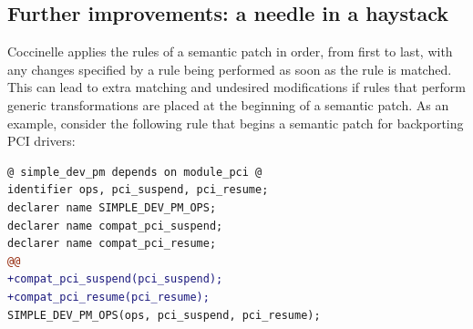 



\subsection{Further improvements: a needle in a haystack}

Coccinelle applies the rules of a semantic patch in order, from first to
last, with any changes specified by a rule being performed as soon as
the rule is matched.  This can lead to extra matching and undesired
modifications if rules that perform generic transformations are placed at
the beginning of a semantic patch.  As an example, consider the following
rule that begins a semantic patch for backporting PCI drivers:

\begin{lstlisting}[language=diff]
@ simple_dev_pm depends on module_pci @
identifier ops, pci_suspend, pci_resume;
declarer name SIMPLE_DEV_PM_OPS;
declarer name compat_pci_suspend;
declarer name compat_pci_resume;
@@
+compat_pci_suspend(pci_suspend);
+compat_pci_resume(pci_resume);
SIMPLE_DEV_PM_OPS(ops, pci_suspend, pci_resume);
\end{lstlisting}

